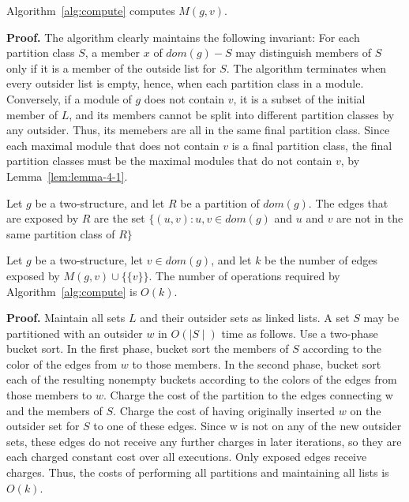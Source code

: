 \begin{mylem}
    \label{lem:4-2}
    Algorithm~\ref{alg:compute} computes $M(g, v)$.
\end{mylem}

\textbf{Proof.}
The algorithm clearly maintains the following invariant: For each partition class $S$, a member $x$ of $dom(g) - S$ may distinguish members of $S$ only if it is a member of the outside list for $S$.
The algorithm terminates when every outsider list is empty, hence, when each partition class in a module.
Conversely, if a module of $g$ does not contain $v$, it is a subset of the initial member of $L$, and its members cannot be split into different partition classes by any outsider.
Thus, its memebers are all in the same final partition class.
Since each maximal module that does not contain $v$ is a final partition class, the final partition classes must be the maximal modules that do not contain $v$, by Lemma~\ref{lem:lemma-4-1}.

\begin{mydef}
    \label{def:4-3}
    Let $g$ be a two-structure, and let $R$ be a partition of $dom(g)$.
    The edges that are exposed by $R$ are the set $\{(u, v): u, v \in dom(g)$ and $u$ and $v$ are not in the same partition class of $R\}$
\end{mydef}

\begin{mylem}
    \label{lem:4-4}
    Let $g$ be a two-structure, let $v \in dom(g)$, and let $k$ be the number of edges exposed by $M(g, v) \cup \{\{v\}\}$.
    The number of operations required by Algorithm~\ref{alg:compute} is $O(k)$.
\end{mylem}

\textbf{Proof.}
Maintain all sets $L$ and their outsider sets as linked lists.
A set $S$ may be partitioned with an outsider $w$ in $O(\mid S \mid)$ time as follows.
Use a two-phase bucket sort.
In the first phase, bucket sort the members of $S$ according to the color of the edges from $w$ to those members.
In the second phase, bucket sort each of the resulting nonempty buckets according to the colors of the edges from those members to $w$.
Charge the cost of the partition to the edges connecting w and the members of $S$.
Charge the cost of having originally inserted $w$ on the outsider set for $S$ to one of these edges.
Since w is not on any of the new outsider sets, these edges do not receive any further charges in later iterations, so they are each charged constant cost over all executions.
Only exposed edges receive charges.
Thus, the costs of performing all partitions and maintaining all lists is $O(k)$.

